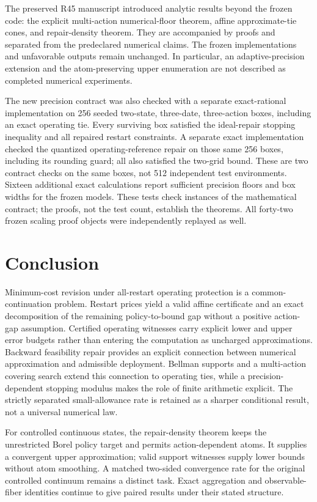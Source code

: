 The preserved R45 manuscript introduced analytic results beyond the frozen code: the explicit multi-action numerical-floor theorem, affine approximate-tie cones, and repair-density theorem. They are accompanied by proofs and separated from the predeclared numerical claims. The frozen implementations and unfavorable outputs remain unchanged. In particular, an adaptive-precision extension and the atom-preserving upper enumeration are not described as completed numerical experiments.

The new precision contract was also checked with a separate exact-rational implementation on 256 seeded two-state, three-date, three-action boxes, including an exact operating tie. Every surviving box satisfied the ideal-repair stopping inequality and all repaired restart constraints. A separate exact implementation checked the quantized operating-reference repair on those same 256 boxes, including its rounding guard; all also satisfied the two-grid bound. These are two contract checks on the same boxes, not 512 independent test environments. Sixteen additional exact calculations report sufficient precision floors and box widths for the frozen models. These tests check instances of the mathematical contract; the proofs, not the test count, establish the theorems. All forty-two frozen scaling proof objects were independently replayed as well.

\section{Conclusion}\label{sec:conclusion45}
Minimum-cost revision under all-restart operating protection is a common-continuation problem. Restart prices yield a valid affine certificate and an exact decomposition of the remaining policy-to-bound gap without a positive action-gap assumption. Certified operating witnesses carry explicit lower and upper error budgets rather than entering the computation as uncharged approximations. Backward feasibility repair provides an explicit connection between numerical approximation and admissible deployment. Bellman supports and a multi-action covering search extend this connection to operating ties, while a precision-dependent stopping modulus makes the role of finite arithmetic explicit. The strictly separated small-allowance rate is retained as a sharper conditional result, not a universal numerical law.

For controlled continuous states, the repair-density theorem keeps the unrestricted Borel policy target and permits action-dependent atoms. It supplies a convergent upper approximation; valid support witnesses supply lower bounds without atom smoothing. A matched two-sided convergence rate for the original controlled continuum remains a distinct task. Exact aggregation and observable-fiber identities continue to give paired results under their stated structure.

